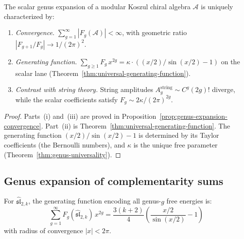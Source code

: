 \begin{theorem}\label{thm:bernoulli-universality}
The scalar genus expansion of a modular Koszul chiral
algebra $\mathcal{A}$ is uniquely characterized by:
\begin{enumerate}[label=\textup{(\roman*)}]
\item \emph{Convergence.} $\sum_{g=1}^\infty |F_g(\mathcal{A})| < \infty$, with geometric ratio $|F_{g+1}/F_g| \to 1/(2\pi)^2$.
\item \emph{Generating function.}
$\sum_{g \geq 1} F_g\, x^{2g}
= \kappa \cdot ((x/2)/\sin(x/2) - 1)$ on the scalar lane
(Theorem~\textup{\ref{thm:universal-generating-function})}.
\item \emph{Contrast with string theory.} String amplitudes
$A_g^{\mathrm{string}} \sim C^g(2g)!$ diverge, while the scalar
coefficients satisfy $F_g \sim 2\kappa/(2\pi)^{2g}$.
\end{enumerate}
\end{theorem}

\begin{proof}
Parts~(i) and~(iii) are proved in Proposition~\ref{prop:genus-expansion-convergence}. Part~(ii) is Theorem~\ref{thm:universal-generating-function}. The generating function $(x/2)/\sin(x/2) - 1$ is determined by its Taylor coefficients (the Bernoulli numbers), and $\kappa$ is the unique free parameter (Theorem~\ref{thm:genus-universality}).
\end{proof}

\subsection{Genus expansion of complementarity sums}\label{subsec:complementarity-sums}

\begin{proposition}\label{prop:complementarity-genus-series}

For $\widehat{\mathfrak{sl}}_{2,k}$, the generating function encoding all genus-$g$ free energies is:
\begin{equation}\label{eq:generating-function}
\sum_{g=1}^{\infty} F_g(\widehat{\mathfrak{sl}}_{2,k}) \, x^{2g} = \frac{3(k+2)}{4} \left(\frac{x/2}{\sin(x/2)} - 1\right)
\end{equation}
with radius of convergence $|x| < 2\pi$.
\end{proposition}

